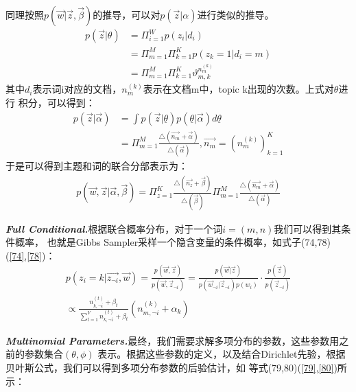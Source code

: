 \documentclass[UTF8]{ctexart}
\begin{document}
\par
同理按照$p(\vec{w}|\vec{z}, \vec{\beta})$的推导，可以对$p(\vec{z}|\alpha)$进行类似的推导。
\begin{align}
p(\vec{z}|\theta) &= \Pi_{i=1}^W p(z_i|d_i)
\\
&= \Pi_{m=1}^M\Pi_{k=1}^K p(z_k=1|d_i=m)
\\
&= \Pi_{m=1}^M\Pi_{k=1}^K \vartheta_{m,k}^{n_m^{(k)}}
\end{align}
其中$d_i$表示词i对应的文档，$n_m^{(k)}$表示在文档m中，topic k出现的次数。上式对$\theta$进行
积分，可以得到：
\begin{align}
p(\vec{z}|\vec{\alpha}) &= \int p(\vec{z}|\underline{\theta}) p(\underline{\theta}|\vec{\alpha}) 
d\underline{\theta}
\\
&= \Pi_{m=1}^M \frac{\triangle(\vec{n_m}+\vec{\alpha})}{\triangle(\vec{\alpha})},
\vec{n_m}=\left( n_m^{(k)}\right)_{k=1}^K
\end{align}
于是可以得到主题和词的联合分部表示为：
\begin{align}
p(\vec{w}, \vec{z} | \vec{\alpha}, \vec{\beta}) = 
\Pi_{z=1}^K \frac{\triangle(\vec{n_z}+\vec{\beta})}{\triangle(\vec{\beta})}
\Pi_{m=1}^M \frac{\triangle(\vec{n_m}+\vec{\alpha})}{\triangle(\vec{\alpha})}
\end{align}
\par
\textbf{\emph{Full Conditional.}}根据联合概率分布，对于一个词$i=(m,n)$我们可以得到其条件概率，
也就是Gibbs Sampler采样一个隐含变量的条件概率，如式子(74,78)(\ref{74},\ref{78})：
\begin{align}
\label{74}
p(z_i=k|\vec{z_{\neg i}}, \vec{w}) = \frac{p(\vec{w}, \vec{z})}{p(\vec{w}, \vec{z}_{\neg i})}
= \frac{p(\vec{w}|\vec{z})}{p(\vec{w}_{\neg i}|\vec{z}_{\neg i})p(w_i)} \cdot 
\frac{p(\vec{z})}{p(\vec{z}_{\neg i})}
\\
\label{78}
\propto \frac{n_{k,\neg i}^{(t)} + \beta_t}{\sum_{t=1}^V n_{k, \neg i}^{(t)}+\beta_{t}}
(n_{m, \neg i}^{(k)} + \alpha_{k})
\end{align}
\par
\textbf{\emph{Multinomial Parameters.}}最终，我们需要求解多项分布的参数，这些参数用之前的参数集合$(\theta, \phi)$
表示。根据这些参数的定义，以及结合Dirichlet先验，根据贝叶斯公式，我们可以得到多项分布参数的后验估计，如
等式(79,80)(\ref{79},\ref{80})所示：
\end{document}
